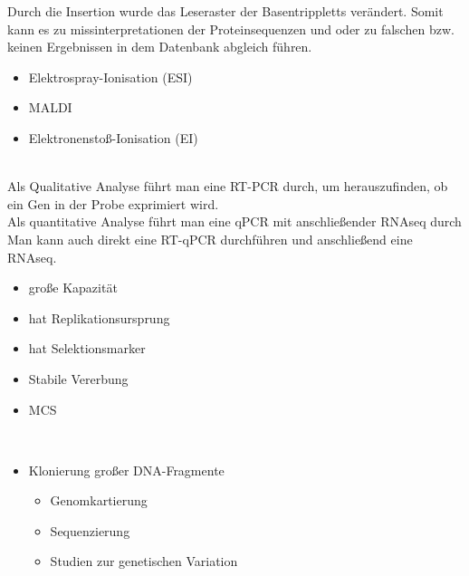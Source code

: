 Durch die Insertion wurde das Leseraster der Basentrippletts verändert. Somit kann es zu missinterpretationen der Proteinsequenzen und oder zu falschen bzw. keinen Ergebnissen in dem Datenbank abgleich führen. \\ \newline

\begin{itemize}
    \item Elektrospray-Ionisation (ESI) 
    \item MALDI
    \item Elektronenstoß-Ionisation (EI)
\end{itemize} $\ $ \\

Als Qualitative Analyse führt man eine RT-PCR durch, um herauszufinden, ob ein Gen in der Probe exprimiert wird. \\
Als quantitative Analyse führt man eine qPCR mit anschließender RNAseq durch  \\ 
Man kann auch direkt eine RT-qPCR durchführen und anschließend eine RNAseq.  \\ \newline

\begin{itemize}
    \item große Kapazität
    \item hat Replikationsursprung
    \item hat Selektionsmarker
    \item Stabile Vererbung
    \item MCS
\end{itemize} $\ $ \\

\begin{itemize}
    \item Klonierung großer DNA-Fragmente
    \begin{itemize}
        \item Genomkartierung
        \item Sequenzierung
        \item Studien zur genetischen Variation
    \end{itemize}
\end{itemize} $\ $ \\

